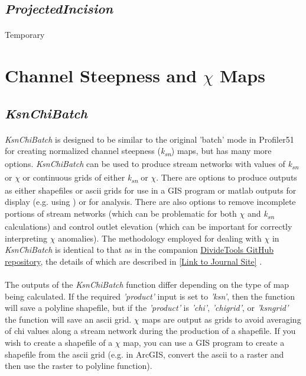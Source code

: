 \subsection{\textit{ProjectedIncision}}
\paragraph{}Temporary

\section{Channel Steepness and $\chi$ Maps}

\subsection{\textit{KsnChiBatch}} \label{sec:KsnBatch}
\paragraph{}\textit{KsnChiBatch} is designed to be similar to the original 'batch' mode in Profiler51 for creating normalized channel steepness (\textit{k\textsubscript{sn}}) maps, but has many more options. \textit{KsnChiBatch} can be used to produce stream networks with values of \textit{k\textsubscript{sn}}  or $\chi$ or continuous grids of either \textit{k\textsubscript{sn}} or $\chi$. There are options to produce outputs as either shapefiles or ascii grids for use in a GIS program or matlab outputs for display (e.g. using ) or for analysis. There are also options to remove incomplete portions of stream networks (which can be problematic for both $\chi$ and \textit{k\textsubscript{sn}} calculations) and control outlet elevation (which can be important for correctly interpreting $\chi$ anomalies). The methodology employed for dealing with $\chi$ in \textit{KsnChiBatch} is identical to that as in the companion \href{https://github.com/amforte/DivideTools}{DivideTools GitHub repository}, the details of which are described in \cite{Forte2018a} \href{https://www.sciencedirect.com/science/article/pii/S0012821X18302292}{[Link to Journal Site]} .

\paragraph{}The outputs of the \textit{KsnChiBatch} function differ depending on the type of map being calculated. If the required \textit{'product'} input is set to \textit{'ksn'}, then the function will save a polyline shapefile, but if the \textit{'product'} is \textit{'chi'}, \textit{'chigrid'}, or \textit{'ksngrid'} the function will save an ascii grid. $\chi$ maps are output as grids to avoid averaging of chi values along a stream network during the production of a shapefile. If you wish to create a shapefile of a $\chi$ map, you can use a GIS program to create a shapefile from the ascii grid (e.g. in ArcGIS, convert the ascii to a raster and then use the raster to polyline function).

